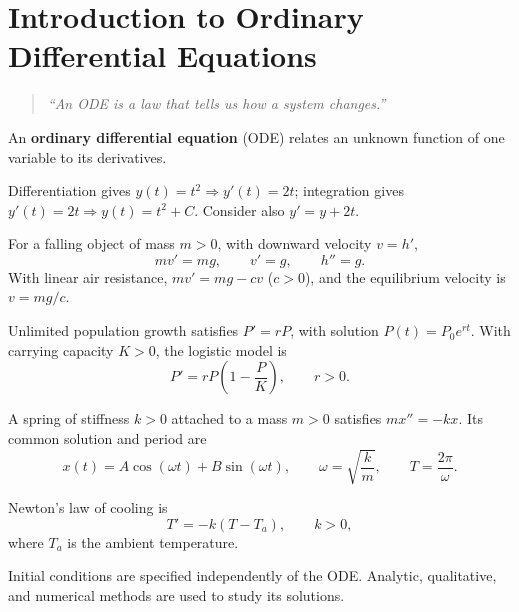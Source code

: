 \chapter{Introduction to Ordinary Differential Equations}

\begin{quote}
\centering\itshape
``An ODE is a law that tells us how a system changes.''
\end{quote}

An \textbf{ordinary differential equation} (ODE) relates an unknown
function of one variable to its derivatives.

\begin{exampleenv*}
Differentiation gives $y(t)=t^2\Rightarrow y'(t)=2t$; integration gives
$y'(t)=2t\Rightarrow y(t)=t^2+C$. Consider also $y'=y+2t$.
\end{exampleenv*}

\begin{exampleenv*}
For a falling object of mass $m>0$, with downward velocity $v=h'$,
\[
    mv'=mg,\qquad v'=g,\qquad h''=g.
\]
With linear air resistance, $mv'=mg-cv$ ($c>0$), and the equilibrium
velocity is $v=mg/c$.
\end{exampleenv*}

\begin{exampleenv*}
Unlimited population growth satisfies $P'=rP$, with solution
$P(t)=P_0e^{rt}$. With carrying capacity $K>0$, the logistic model is
\[
    P'=rP\left(1-\frac PK\right),\qquad r>0.
\]
\end{exampleenv*}

\begin{exampleenv*}
A spring of stiffness $k>0$ attached to a mass $m>0$ satisfies
$mx''=-kx$. Its common solution and period are
\[
    x(t)=A\cos(\omega t)+B\sin(\omega t),\qquad
    \omega=\sqrt{\frac km},\qquad T=\frac{2\pi}{\omega}.
\]
\end{exampleenv*}

\begin{exampleenv*}
Newton's law of cooling is
\[
    T'=-k(T-T_a),\qquad k>0,
\]
where $T_a$ is the ambient temperature.
\end{exampleenv*}

\begin{remark*}
Initial conditions are specified independently of the ODE.
Analytic, qualitative, and numerical methods are used to study its solutions.
\end{remark*}

